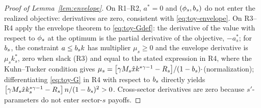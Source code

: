 \documentclass[12pt]{article}
\begin{document}
\begin{proof}[Proof of Lemma~\ref{lem:envelope}]
On R1--R2, $a^{*}=0$ and $(\phi_{s},b_{s})$ do not enter the
realized objective: derivatives are zero, consistent with
\eqref{eq:toy-envelope}. On R3--R4 apply the envelope theorem to
\eqref{eq:toy-Gdef}: the derivative of the value with respect to
$\phi_{s}$ at the optimum is the partial derivative of the objective,
$-a^{*}_{s}$; for $b_{s}$, the constraint $a\leq b_{s}k$ has
multiplier $\mu_{s}\geq0$ and the envelope derivative is
$\mu_{s}k^{*}_{s}$, zero when slack (R3) and equal to the stated
expression in R4, where the Kuhn--Tucker condition gives
$\mu_{s}=\big[\gamma M_{s}\hat x k^{*\gamma-1}-R_{s}\big]
/(1-b_{s})\cdot$(normalization); differentiating \eqref{eq:toy-G}
in R4 with respect to $b_{s}$ directly yields
$\big[\gamma M_{s}\hat x k^{*\gamma-1}_{s}-R_{s}\big]\,
n/(1-b_{s})^{2}>0$. Cross-sector derivatives are zero because
$s'$-parameters do not enter sector-$s$ payoffs.
\end{proof}
 
\end{document}
